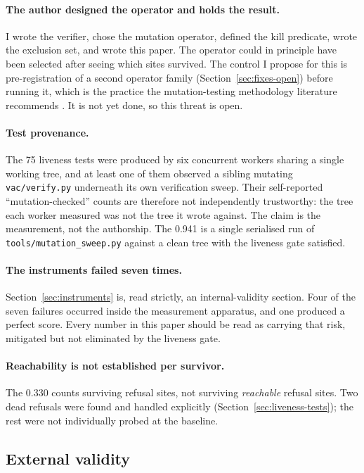 \documentclass[11pt]{article}
\begin{document}
\paragraph{The author designed the operator and holds the result.} I wrote the verifier, chose
the mutation operator, defined the kill predicate, wrote the exclusion set, and wrote this
paper. The operator could in principle have been selected after seeing which sites survived.
The control I propose for this is pre-registration of a second operator family
(Section~\ref{sec:fixes-open}) before running it, which is the practice the mutation-testing
methodology literature recommends \citep{papadakis2019mutation}. It is not yet done, so this
threat is open.

\paragraph{Test provenance.} The 75 liveness tests were produced by six concurrent workers
sharing a single working tree, and at least one of them observed a sibling mutating
\texttt{vac/verify.py} underneath its own verification sweep. Their self-reported
``mutation-checked'' counts are therefore not independently trustworthy: the tree each worker
measured was not the tree it wrote against. The claim is the measurement, not the authorship.
The 0.941 is a single serialised run of \texttt{tools/mutation\_sweep.py} against a clean tree
with the liveness gate satisfied.

\paragraph{The instruments failed seven times.} Section~\ref{sec:instruments} is, read
strictly, an internal-validity section. Four of the seven failures occurred inside the
measurement apparatus, and one produced a perfect score. Every number in this paper should be
read as carrying that risk, mitigated but not eliminated by the liveness gate.

\paragraph{Reachability is not established per survivor.} The 0.330 counts surviving refusal
sites, not surviving \emph{reachable} refusal sites. Two dead refusals were found and handled
explicitly (Section~\ref{sec:liveness-tests}); the rest were not individually probed at the
baseline.

\subsection{External validity}
\end{document}
